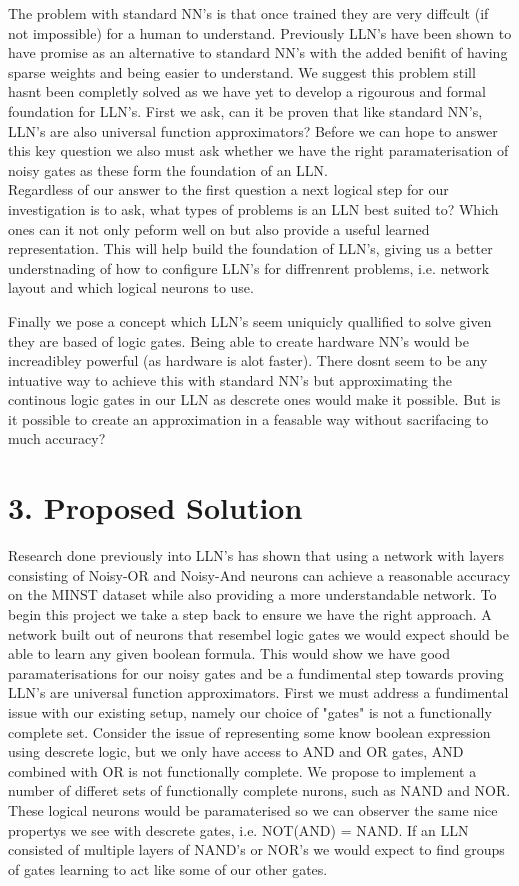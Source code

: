 \documentclass[11pt, a4paper, twoside, openright]{report}
\begin{document}
The problem with standard NN's is that once trained they are very diffcult (if not impossible) for a human to understand. Previously LLN's have been shown to have promise as an alternative to standard NN's with the added benifit of having sparse weights and being easier to understand. We suggest this problem still hasnt been completly solved as we have yet to develop a rigourous and formal foundation for LLN's. First we ask, can it be proven that like standard NN's, LLN's are also universal function approximators?  Before we can hope to answer this key question we also must ask whether we have the right paramaterisation of noisy gates as these form the foundation of an LLN. \\

Regardless of our answer to the first question a next logical step for our investigation is to ask, what types of problems is an LLN best suited to? Which ones can it not only peform well on but also provide a useful learned representation. This will help build the foundation of LLN's, giving us a better understnading of how to configure LLN's for diffrenrent problems, i.e. network layout and which logical neurons to use.

Finally we pose a concept which LLN's seem uniquicly quallified to solve given they are based of logic gates. Being able to create hardware NN's would be increadibley powerful (as hardware is alot faster). There dosnt seem to be any intuative way to achieve this with standard NN's but approximating the continous logic gates in our LLN as descrete ones would make it possible. But is it possible to create an approximation in a feasable way without sacrifacing to much accuracy?

\section*{3. Proposed Solution}

Research done previously into LLN's has shown that using a network with layers consisting of Noisy-OR and Noisy-And neurons can achieve a reasonable accuracy on the MINST dataset while also providing a more understandable network. To begin this project we take a step back to ensure we have the right approach. A network built out of neurons that resembel logic gates we would expect should be able to learn any given boolean formula. This would show we have good paramaterisations for our noisy gates and be a fundimental step towards proving LLN's are universal function approximators. First we must address a fundimental issue with our existing setup, namely our choice of "gates" is not a functionally complete set. Consider the issue of representing some know boolean expression using descrete logic, but we only have access to AND and OR gates, AND combined with OR is not functionally complete. We propose to implement a number of differet sets of functionally complete nurons, such as NAND and NOR. These logical neurons would be paramaterised so we can observer the same nice propertys we see with descrete gates, i.e. NOT(AND) = NAND. If an LLN consisted of multiple layers of NAND's or NOR's we would expect to find groups of gates learning to act like some of our other gates. \\
\end{document}
